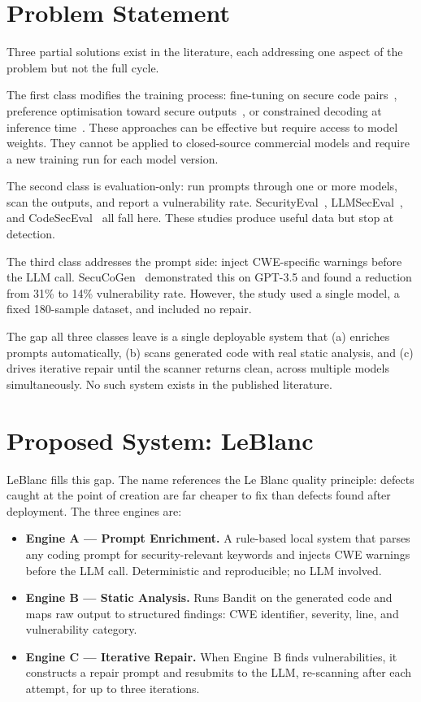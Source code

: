 \documentclass[12pt,a4paper]{report}
\begin{document}
\section{Problem Statement}
\label{sec:problem}

Three partial solutions exist in the literature, each addressing one aspect of the
problem but not the full cycle.

The first class modifies the training process: fine-tuning on secure code
pairs~\cite{hexacoder2024}, preference optimisation toward secure
outputs~\cite{lpo2024}, or constrained decoding at inference
time~\cite{codeguard2024}. These approaches can be effective but require access
to model weights. They cannot be applied to closed-source commercial models and
require a new training run for each model version.

The second class is evaluation-only: run prompts through one or more models, scan
the outputs, and report a vulnerability rate. SecurityEval~\cite{securityeval},
LLMSecEval~\cite{tony2023llmseceval}, and CodeSecEval~\cite{codeseceval2023} all
fall here. These studies produce useful data but stop at detection.

The third class addresses the prompt side: inject CWE-specific warnings before
the LLM call. SecuCoGen~\cite{tihanyi2023secucogenicse} demonstrated this on
GPT-3.5 and found a reduction from 31\% to 14\% vulnerability rate. However, the
study used a single model, a fixed 180-sample dataset, and included no repair.

The gap all three classes leave is a single deployable system that (a) enriches
prompts automatically, (b) scans generated code with real static analysis, and
(c) drives iterative repair until the scanner returns clean, across multiple models
simultaneously. No such system exists in the published literature.

\section{Proposed System: LeBlanc}
\label{sec:proposed}

LeBlanc fills this gap. The name references the Le Blanc quality principle: defects
caught at the point of creation are far cheaper to fix than defects found after
deployment. The three engines are:

\begin{itemize}
  \item \textbf{Engine A --- Prompt Enrichment.} A rule-based local system that
        parses any coding prompt for security-relevant keywords and injects CWE
        warnings before the LLM call. Deterministic and reproducible; no LLM
        involved.
  \item \textbf{Engine B --- Static Analysis.} Runs Bandit on the generated code
        and maps raw output to structured findings: CWE identifier, severity, line,
        and vulnerability category.
  \item \textbf{Engine C --- Iterative Repair.} When Engine~B finds
        vulnerabilities, it constructs a repair prompt and resubmits to the LLM,
        re-scanning after each attempt, for up to three iterations.
\end{itemize}
\end{document}
